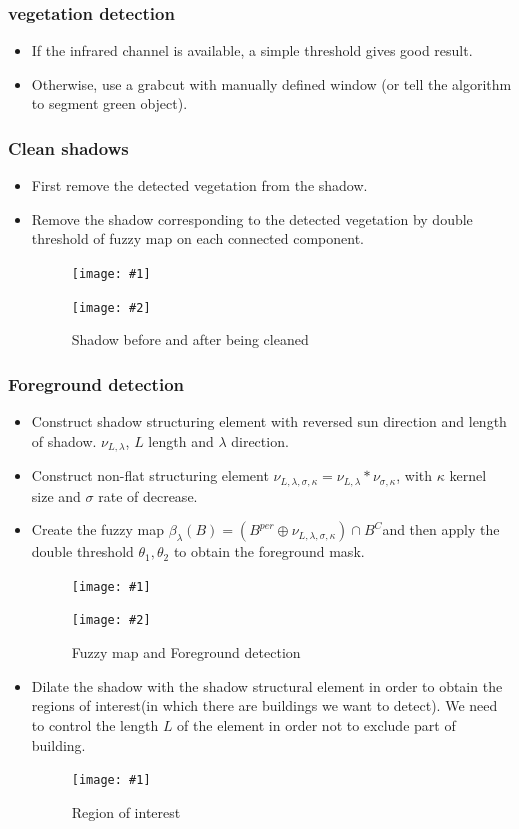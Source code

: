 \documentclass[compress]{beamer} %
\newcommand{\insertTwoF}[4]{
  \begin{figure}[h!]
    \centering
    \begin{minipage}{#4\linewidth}
    \texttt{[image: \#1]}
    \end{minipage}
    \begin{minipage}{#4\linewidth}
    \texttt{[image: \#2]}
    \end{minipage}
      \caption{#3}
  \end{figure}  
}
\newcommand{\insertF}[3]{
  \begin{figure}[h!]
    \centering
    \begin{minipage}{#3\linewidth}
    \texttt{[image: \#1]}
    \end{minipage}  
      \caption{#2}
  \end{figure}  
}
\begin{document}
\begin{frame}
  \frametitle{vegetation detection}
  \begin{itemize}
   \item If the infrared channel is available, a simple threshold gives good result.
   \item Otherwise, use a grabcut with manually defined window (or tell the algorithm to segment green object).
   \end{itemize}
 \end{frame} 
 
 
\begin{frame}
  \frametitle{Clean shadows}
  \begin{itemize}
   \item First remove the detected vegetation from the shadow.
   \item Remove the shadow corresponding to the detected vegetation by double threshold of fuzzy map on each connected component. 
   \insertTwoF{shadow}{cleaned_shadow}{Shadow before and after being cleaned}{0.4}
  \end{itemize}
 \end{frame} 
 
 
\begin{frame}
  \frametitle{Foreground detection}
    
  \begin{itemize}
   \item Construct shadow structuring element with reversed sun direction and length of shadow. $\nu_{L,\lambda}$, $L$ length and $\lambda$ direction. 
   \item Construct non-flat structuring element $\nu_{L,\lambda,\sigma,\kappa}=\nu_{L,\lambda}*\nu_{\sigma,\kappa}$, with $\kappa$ kernel size and $\sigma$ rate of decrease.
   \item Create the fuzzy map $\beta_{\lambda}(B)=(B^{per}\oplus \nu_{L,\lambda,\sigma,\kappa})\cap B^C$and then apply the double threshold $\theta_1, \theta_2$ to obtain the foreground mask.
   \insertTwoF{fuzzy_map}{fore-back}{Fuzzy map and Foreground detection}{0.4}
  \end{itemize}
 \end{frame} 
 
 
\begin{frame}
\begin{itemize}
  \frametitle{ROI detection}
   \item Dilate the shadow with the shadow structural element in order to obtain the regions of interest(in which there are buildings we want to detect). We need to control the length $L$ of the element in order not to exclude part of building.
   \insertF{ROI}{Region of interest}{0.8}
  \end{itemize}
 \end{frame} 
 
\end{document}
